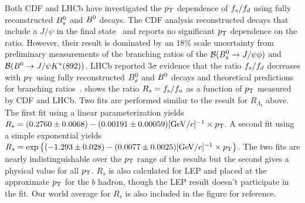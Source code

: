 Both CDF and LHCb have investigated the $p_{\rm T}$ dependence of $f_{s}/f_{d}$ using fully 
reconstructed $B^0_s$ and $B^0$ decays.  The CDF analysis reconstructed decays that include 
a $J/\psi$ in the final state~\cite{CDFnote10795:2012} and reports no significant $p_{\rm T}$ dependence 
on the ratio.  However, their result is dominated by an $18$\% scale uncertainty
from preliminary measurements of the branching ratios of the ${\cal B}(B^0_s\to J/\psi \phi)$ and 
${\cal B}(B^0\to J/\psi K^{*}(892))$.
LHCb reported $3\sigma$ evidence that the ratio $f_{s}/f_{d}$ decreases with 
$p_{\rm T}$ using fully reconstructed $B^0_s$ and $B^0$ decays and theoretical predictions for branching ratios~\cite{Aaij:2013qqa}.  shows
the ratio $R_s = f_{s}/f_{u}$ as a function of $p_{\rm T}$ measured by CDF and LHCb.
Two fits are performed similar to the result for $R_{\Lambda_b}$ above.  The first
fit using a linear parameterization yields
$R_s = (0.2760\pm 0.0068) - (0.00191\pm 0.00059)[{\rm GeV}/c]^{-1} \times p_{\rm T}$.  
A second fit using a simple exponential yields
$R_s = \exp\left\{(-1.293\pm 0.028) - (0.0077\pm 0.0025)[{\rm GeV}/c]^{-1} \times p_{\rm T}\right\}$.  
The two fits are nearly indistinguishable over the $p_{\rm T}$ range of the results
but the second gives a physical value for all $p_{\rm T}$.  $R_s$ is also calculated
for LEP and placed at the approximate $p_{\rm T}$ for the $b$ hadron, though the LEP result
doesn't participate in the fit.  Our world average for $R_s$ is also included in the
figure for reference.

